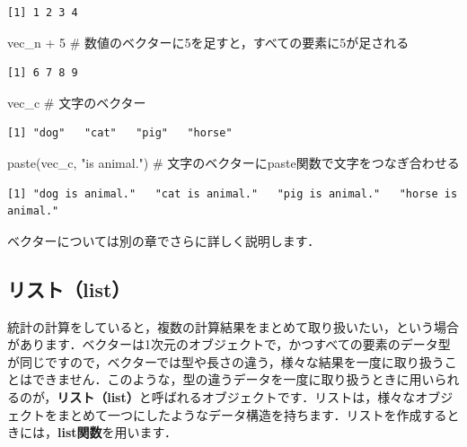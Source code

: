 \documentclass[
  letterpaper,
  DIV=11,
  numbers=noendperiod]{scrreprt}
\newenvironment{Shaded}{\begin{snugshade}}{\end{snugshade}}
\newcommand{\CommentTok}[1]{\textcolor[rgb]{0.37,0.37,0.37}{#1}}
\newcommand{\DecValTok}[1]{\textcolor[rgb]{0.68,0.00,0.00}{#1}}
\newcommand{\FunctionTok}[1]{\textcolor[rgb]{0.28,0.35,0.67}{#1}}
\newcommand{\NormalTok}[1]{\textcolor[rgb]{0.00,0.23,0.31}{#1}}
\newcommand{\SpecialCharTok}[1]{\textcolor[rgb]{0.37,0.37,0.37}{#1}}
\newcommand{\StringTok}[1]{\textcolor[rgb]{0.13,0.47,0.30}{#1}}
\begin{document}
\begin{verbatim}
[1] 1 2 3 4
\end{verbatim}

\begin{Shaded}
\begin{Highlighting}[]
\NormalTok{vec\_n }\SpecialCharTok{+} \DecValTok{5} \CommentTok{\# 数値のベクターに5を足すと，すべての要素に5が足される}
\end{Highlighting}
\end{Shaded}

\begin{verbatim}
[1] 6 7 8 9
\end{verbatim}

\begin{Shaded}
\begin{Highlighting}[]
\NormalTok{vec\_c }\CommentTok{\# 文字のベクター}
\end{Highlighting}
\end{Shaded}

\begin{verbatim}
[1] "dog"   "cat"   "pig"   "horse"
\end{verbatim}

\begin{Shaded}
\begin{Highlighting}[]
\FunctionTok{paste}\NormalTok{(vec\_c, }\StringTok{"is animal."}\NormalTok{) }\CommentTok{\# 文字のベクターにpaste関数で文字をつなぎ合わせる}
\end{Highlighting}
\end{Shaded}

\begin{verbatim}
[1] "dog is animal."   "cat is animal."   "pig is animal."   "horse is animal."
\end{verbatim}

ベクターについては別の章でさらに詳しく説明します．

\hypertarget{ux30eaux30b9ux30c8list}{%
\subsection{リスト（list）}\label{ux30eaux30b9ux30c8list}}

統計の計算をしていると，複数の計算結果をまとめて取り扱いたい，という場合があります．ベクターは1次元のオブジェクトで，かつすべての要素のデータ型が同じですので，ベクターでは型や長さの違う，様々な結果を一度に取り扱うことはできません．このような，型の違うデータを一度に取り扱うときに用いられるのが，\textbf{リスト（list）}と呼ばれるオブジェクトです．リストは，様々なオブジェクトをまとめて一つにしたようなデータ構造を持ちます．リストを作成するときには，\textbf{list関数}を用います．
\end{document}

